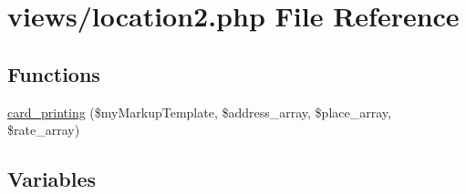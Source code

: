 \hypertarget{location2_8php}{}\section{views/location2.php File Reference}
\label{location2_8php}
\subsection*{Functions}
\begin{DoxyCompactItemize}
\item 
\mbox{\hyperlink{location2_8php_a94f49615449deadff259cd73979515b3}{card\+\_\+printing}} (\$my\+Markup\+Template, \$address\+\_\+array, \$place\+\_\+array, \$rate\+\_\+array)
\end{DoxyCompactItemize}
\subsection*{Variables}
